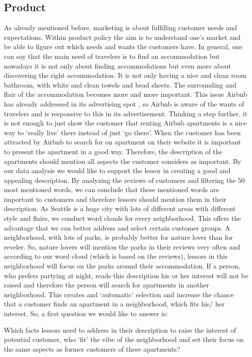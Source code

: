 \subsection{Product}
\noindent As already mentioned before, marketing is about fulfilling customer needs and expectations. Within product policy the aim is to understand one’s market and be able to figure out which needs and wants the customers have. In general, one can say that the main need of travelers is to find an accommodation but nowadays it is not only about finding accommodations but even more about discovering the right accommodation. It is not only having a nice and clean room bathroom, with white and clean towels and bead sheets. The surrounding and flair of the accommodation becomes more and more important. This issue Airbnb has already addressed in its advertising spot \cite{RN6}, so Airbnb is aware of the wants of travelers and is responsive to this in its advertisement. Thinking a step further, it is not enough to just show the customer that renting Airbnb apartments is a nice way to ‘really live’ there instead of just ‘go there’. When the customer has been attracted by Airbnb to search for on apartment on their website it is important to present the apartment in a good way. Therefore, the description of the apartments should mention all aspects the customer considers as important. By our data analysis we would like to support the lessor in creating a good and appealing description. By analyzing the reviews of customers and filtering the 50 most mentioned words, we can conclude that these mentioned words are important to customers and therefore lessors should mention them in their description. As Seattle is a huge city with lots of different areas with different style and flairs, we conduct word clouds for every neighborhood. This offers the advantage that we can better address and select certain customer groups. A neighborhood, with lots of parks, is probably better for nature lover than for reveler. So, nature lovers will mention the parks in their reviews very often and according to our word cloud (which is based on the reviews), lessors in this neighborhood will focus on the parks around their accommodation. If a person, who prefers partying at night, reads this description his or her interest will not be raised and therefore the person will search for apartments in another neighborhood. This creates and ‘automatic’ selection and increase the chance that a customer finds an apartment in a neighborhood, which fits his/ her interest. So, a first question we would like to answer is: \begin{itshape}Which facts lessors need to address in their description to raise the interest of potential customer, who ‘fit’ the vibe of the neighborhood and set their focus on the same aspects as former customers of these apartments?\end{itshape}
